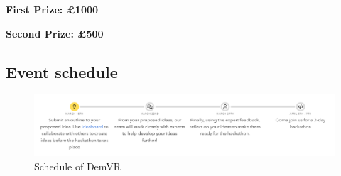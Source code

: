 \textbf{First Prize: £1000}

\textbf{Second Prize: £500}



\subsection{Event schedule}
\label{app:DemVR:EventSchedule}
\begin{figure}[htp]
    \centering
    \includegraphics[width=0.8\linewidth]{Images/Appendix/DemVR appendix/Schedule.png}
    \caption{Schedule of DemVR}
    \label{fig:App:DemVRSchedule}
\end{figure}

